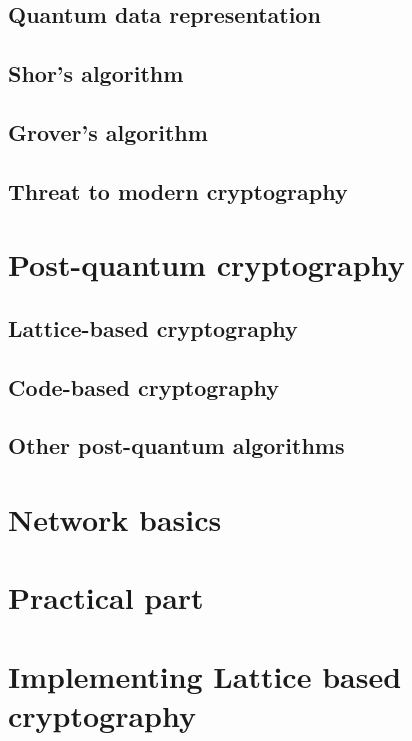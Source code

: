 \section{Quantum data representation}
\label{sec:quantum_data_repr}


\section{Shor's algorithm}
\label{sec:shors_algorithm}


\section{Grover's algorithm}
\label{sec:grovers_alg}


\section{Threat to modern cryptography}
\label{sec:threat_to_modern}


\chapter{Post-quantum cryptography}
\label{ch:pq-crypto}


\section{Lattice-based cryptography}
\label{sec:lattice-based_crypto}


\section{Code-based cryptography}
\label{sec:code-based_crypto}


\section{Other post-quantum algorithms}
\label{sec:other_pq_alg}


\chapter{Network basics}


\chapter{Practical part}


\chapter{Implementing Lattice based cryptography}



